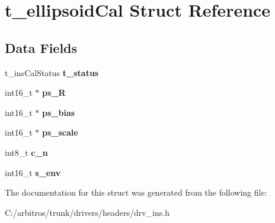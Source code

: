 \hypertarget{structt__ellipsoid_cal}{\section{t\-\_\-ellipsoid\-Cal Struct Reference}
\label{structt__ellipsoid_cal}
}
\subsection*{Data Fields}
\begin{DoxyCompactItemize}
\item 
\hypertarget{structt__ellipsoid_cal_a3b9d69b4735fba79bb58419dd4fcfc22}{t\-\_\-ins\-Cal\-Status {\bfseries t\-\_\-status}}\label{structt__ellipsoid_cal_a3b9d69b4735fba79bb58419dd4fcfc22}

\item 
\hypertarget{structt__ellipsoid_cal_a52045a61785308fb2e1b8fcc8a9889f3}{int16\-\_\-t $\ast$ {\bfseries ps\-\_\-\-R}}\label{structt__ellipsoid_cal_a52045a61785308fb2e1b8fcc8a9889f3}

\item 
\hypertarget{structt__ellipsoid_cal_ac7c8cdf99666d6d96504824bb8f67ff7}{int16\-\_\-t $\ast$ {\bfseries ps\-\_\-bias}}\label{structt__ellipsoid_cal_ac7c8cdf99666d6d96504824bb8f67ff7}

\item 
\hypertarget{structt__ellipsoid_cal_abee581645aebb42040081e6fa317bf61}{int16\-\_\-t $\ast$ {\bfseries ps\-\_\-scale}}\label{structt__ellipsoid_cal_abee581645aebb42040081e6fa317bf61}

\item 
\hypertarget{structt__ellipsoid_cal_ad079e0c88d1921b6a114370f312673cf}{int8\-\_\-t {\bfseries c\-\_\-n}}\label{structt__ellipsoid_cal_ad079e0c88d1921b6a114370f312673cf}

\item 
\hypertarget{structt__ellipsoid_cal_abefbf7091a6a9cd951cd53e242a6aa33}{int16\-\_\-t {\bfseries s\-\_\-env}}\label{structt__ellipsoid_cal_abefbf7091a6a9cd951cd53e242a6aa33}

\end{DoxyCompactItemize}


The documentation for this struct was generated from the following file\-:\begin{DoxyCompactItemize}
\item 
C\-:/arbitros/trunk/drivers/headers/drv\-\_\-ins.\-h\end{DoxyCompactItemize}
